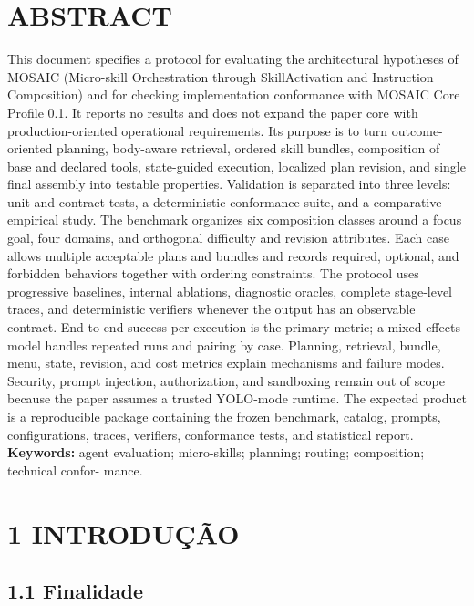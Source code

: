 \documentclass[12pt,a4paper]{article}
\begin{document}

\section*{ABSTRACT}

This document specifies a protocol for evaluating the architectural hypotheses of MOSAIC (Micro-skill Orchestration through SkillActivation and Instruction Composition) and for checking implementation conformance with MOSAIC Core Profile 0.1. It reports no results and does not expand the paper core with production-oriented operational requirements. Its purpose is to turn outcome-oriented planning, body-aware retrieval, ordered skill bundles, composition of base and declared tools, state-guided execution, localized plan revision, and single final assembly into testable properties. Validation is separated into three levels: unit and contract tests, a deterministic conformance suite, and a comparative empirical study. The benchmark organizes six composition classes around a focus goal, four domains, and orthogonal difficulty and revision attributes. Each case allows multiple acceptable plans and bundles and records required, optional, and forbidden behaviors together with ordering constraints. The protocol uses progressive baselines, internal ablations, diagnostic oracles, complete stage-level traces, and deterministic verifiers whenever the output has an observable contract. End-to-end success per execution is the primary metric; a mixed-effects model handles repeated runs and pairing by case. Planning, retrieval, bundle, menu, state, revision, and cost metrics explain mechanisms and failure modes. Security, prompt injection, authorization, and sandboxing remain out of scope because the paper assumes a trusted YOLO-mode runtime. The expected product is a reproducible package containing the frozen benchmark, catalog, prompts, configurations, traces, verifiers, conformance tests, and statistical report. \textbf{Keywords:} agent evaluation; micro-skills; planning; routing; composition; technical confor- mance.


\section*{1 INTRODUÇÃO}

\subsection*{1.1 Finalidade}
\end{document}
